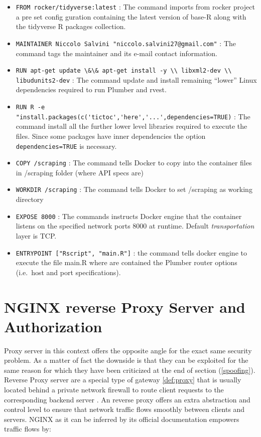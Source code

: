 \documentclass[
  12pt,
  a4paper,
  oneside]{book}
\newcommand{\passthrough}[1]{#1}
\theoremstyle{definition}
\theoremstyle{definition}
\theoremstyle{definition}
\theoremstyle{remark}
\begin{document}
\begin{itemize}
\item
  \passthrough{\lstinline!FROM rocker/tidyverse:latest!} : The command imports from rocker project a pre set config guration containing the latest version of base-R along with the tidyverse \citep{tidyverse} R packages collection.
\item
  \passthrough{\lstinline!MAINTAINER Niccolo Salvini "niccolo.salvini27@gmail.com"!} : The command tags the maintainer and its e-mail contact information.
\item
  \passthrough{\lstinline!RUN apt-get update \&\& apt-get install -y \\ libxml2-dev \\ libudunits2-dev!} : The command update and install remaining ``lower'' Linux dependencies required to run Plumber and rvest.
\item
  \passthrough{\lstinline!RUN R -e "install.packages(c('tictoc','here','...',dependencies=TRUE)!} : The command install all the further lower level libraries required to execute the files. Since some packages have inner dependencies the option \passthrough{\lstinline!dependencies=TRUE!} is necessary.
\item
  \passthrough{\lstinline!COPY /scraping!} : The command tells Docker to copy into the container files in /scraping folder (where API specs are)
\item
  \passthrough{\lstinline!WORKDIR /scraping!} : The command tells Docker to set /scraping as working directory
\item
  \passthrough{\lstinline!EXPOSE 8000!} : The commands instructs Docker engine that the container listens on the specified network ports 8000 at runtime. Default \emph{transportation} layer is TCP.
\item
  \passthrough{\lstinline!ENTRYPOINT ["Rscript", "main.R"]!} : the command tells docker engine to execute the file main.R where are contained the Plumber router options (i.e.~host and port specifications).
\end{itemize}

\hypertarget{nginx}{%
\section{NGINX reverse Proxy Server and Authorization}\label{nginx}}

Proxy server in this context offers the opposite angle for the exact same security problem. As a matter of fact the downside is that they can be exploited for the same reason for which they have been criticized at the end of section (\ref{spoofing}). Reverse Proxy server are a special type of gateway \ref{def:proxy} that is usually located behind a private network firewall to route client requests to the corresponding backend server \citep{nginxDocs}. An reverse proxy offers an extra abstraction and control level to ensure that network traffic flows smoothly between clients and servers. NGINX as it can be inferred by its official documentation empowers traffic flows by:
\end{document}
